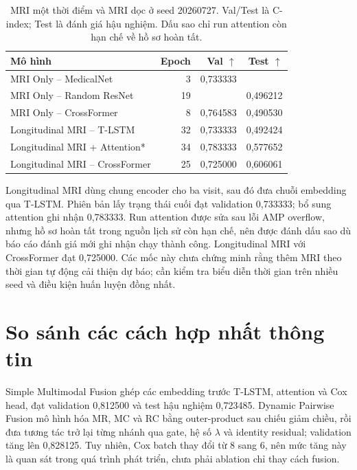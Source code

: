 \begin{table}[htbp]
\centering
\small
\setlength{\tabcolsep}{4pt}
\caption[C-index của các mô hình MRI trên cùng seed]{MRI một thời điểm và MRI dọc ở seed 20260727. Val/Test là C-index; Test là đánh giá hậu nghiệm. Dấu sao chỉ run attention còn hạn chế về hồ sơ hoàn tất.}
\label{tab:mri-milestones}
\begin{tabularx}{\linewidth}{@{}Y r r r@{}}
\toprule
\textbf{Mô hình} & \textbf{Epoch} & \textbf{Val $\uparrow$} & \textbf{Test $\uparrow$} \\
\midrule
MRI Only -- MedicalNet & 3 & 0,733333 &  \\
MRI Only -- Random ResNet & 19 &  & 0,496212 \\
MRI Only -- CrossFormer & 8 & 0,764583 & 0,490530 \\
Longitudinal MRI -- T-LSTM & 32 & 0,733333 & 0,492424 \\
Longitudinal MRI + Attention* & 34 & 0,783333 & 0,577652 \\
Longitudinal MRI -- CrossFormer & 25 & 0,725000 & 0,606061 \\
\bottomrule
\end{tabularx}
\end{table}

Longitudinal MRI dùng chung encoder cho ba visit, sau đó đưa chuỗi embedding qua T-LSTM. Phiên bản lấy trạng thái cuối đạt validation 0,733333; bổ sung attention ghi nhận 0,783333. Run attention được sửa sau lỗi AMP overflow, nhưng hồ sơ hoàn tất trong nguồn lịch sử còn hạn chế, nên được đánh dấu sao dù báo cáo đánh giá mới ghi nhận chạy thành công. Longitudinal MRI với CrossFormer đạt 0,725000. Các mốc này chưa chứng minh rằng thêm MRI theo thời gian tự động cải thiện dự báo; cần kiểm tra biểu diễn thời gian trên nhiều seed và điều kiện huấn luyện đồng nhất.

\section{So sánh các cách hợp nhất thông tin}
\label{sec:concat-results}
\label{sec:dynamic-pairwise-results}
Simple Multimodal Fusion ghép các embedding trước T-LSTM, attention và Cox head, đạt validation 0,812500 và test hậu nghiệm 0,723485. Dynamic Pairwise Fusion mô hình hóa MR, MC và RC bằng outer-product sau chiếu giảm chiều, rồi đưa tương tác trở lại từng nhánh qua gate, hệ số $\lambda$ và identity residual; validation tăng lên 0,828125. Tuy nhiên, Cox batch thay đổi từ 8 sang 6, nên mức tăng này là quan sát trong quá trình phát triển, chưa phải ablation chỉ thay cách fusion.

